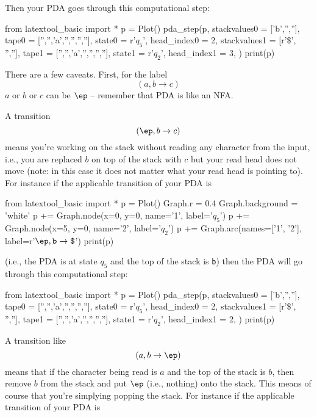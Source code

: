 Then your PDA goes through this computational step:

\begin{python}
from latextool_basic import *
p = Plot()
pda_step(p,
         stackvalues0 = ['b','',''],
         tape0 = ['','','a','','','',''],
         state0 = r'$q_5$',
         head_index0 = 2,
         stackvalues1 = [r'\$', '',''],
         tape1 = ['','','a','','','',''],
         state1 = r'$q_2$',
         head_index1 = 3,
        )        
print(p)
\end{python}

There are a few caveats.
First, for the label
\[
(a, b \rightarrow c)
\]
$a$ or $b$ or $c$ can be $\ep$
-- remember that PDA is like an NFA.

A transition
\[
(\ep, b \rightarrow c)
\]
means 
you're working on the stack without reading any character from the
input, i.e., you are replaced $b$ on top of the stack with $c$
but your read head does not move
(note: in this case it does not matter what your read head is pointing to).
For instance if the applicable transition of your PDA is

\begin{python}
from latextool_basic import *
p = Plot()
Graph.r = 0.4
Graph.background = 'white'
p += Graph.node(x=0, y=0, name='1', label='$q_5$')
p += Graph.node(x=5, y=0, name='2', label='$q_2$')
p += Graph.arc(names=['1', '2'], label=r'$\texttt{$\ep$}, \texttt{b} \rightarrow \texttt{\$} $')
print(p)
\end{python}

(i.e., the PDA is at state $q_5$ and the top of the stack is \verb!b!)
then the PDA will go through this computational step:

\begin{python}
from latextool_basic import *
p = Plot()
pda_step(p,
         stackvalues0 = ['b','',''],
         tape0 = ['','','a','','','',''],
         state0 = r'$q_5$',
         head_index0 = 2,
         stackvalues1 = [r'\$', '',''],
         tape1 = ['','','a','','','',''],
         state1 = r'$q_2$',
         head_index1 = 2,
        )        
print(p)
\end{python}


A transition like
\[
(a, b \rightarrow \ep)
\]
means that if the character being read is $a$ and the top of the
stack is $b$, then remove $b$ from the stack and put $\ep$  (i.e., nothing)
onto the stack.
This means of course that you're simplying popping the stack.
For instance if the applicable transition of your PDA is

